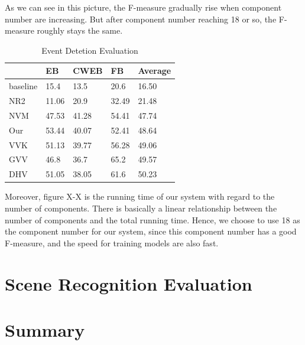 As we can see in this picture, the F-measure gradually rise when component number are increasing. 
But after component number reaching 18 or so, the F-measure roughly stays the same. \\ 

\begin{table}[htb]
\centering
\caption{Event Detetion Evaluation}
\begin{tabular}{lllll}
\hline
         & EB    & CWEB  & FB    & Average \\
\hline
baseline & 15.4  & 13.5  & 20.6  & 16.50   \\
NR2      & 11.06 & 20.9  & 32.49 & 21.48   \\
NVM      & 47.53 & 41.28 & 54.41 & 47.74   \\
Our      & 53.44 & 40.07 & 52.41 & 48.64   \\
VVK      & 51.13 & 39.77 & 56.28 & 49.06   \\
GVV      & 46.8  & 36.7  & 65.2  & 49.57   \\
DHV      & 51.05 & 38.05 & 61.6  & 50.23   \\     
\hline
\end{tabular}
\end{table}

Moreover, figure X-X is the running time of our system with regard to the number of components. 
There is basically a linear relationship between the number of components and the total running time. 
Hence, we choose to use 18 as the component number for our system, since this component number has a good F-measure, and the speed for training models are also fast.\\ 



\section{Scene Recognition Evaluation}

\section{Summary}
